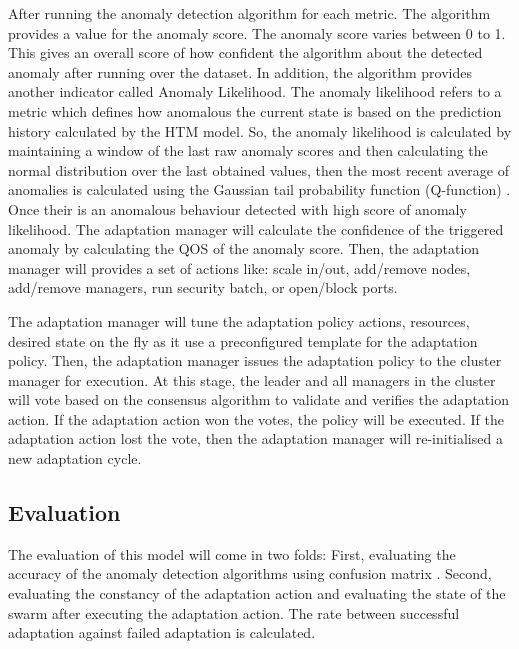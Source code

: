 \documentclass[sigconf]{acmart}
\begin{document}
After running the anomaly detection algorithm for each metric. The algorithm provides a value for the anomaly score. The anomaly score varies between 0 to 1. This gives an overall score of how confident the algorithm about the detected anomaly after running over the dataset. In addition, the algorithm provides another indicator called Anomaly Likelihood. The anomaly likelihood refers to a metric which defines how anomalous the current state is based on the prediction history calculated by the HTM model. So, the anomaly likelihood is calculated by maintaining a window of the last raw anomaly scores and then calculating the normal distribution over the last obtained values, then the most recent average of anomalies is calculated using the Gaussian tail probability function (Q-function) \cite{craig1991new}. Once their is an anomalous behaviour detected with high score of anomaly likelihood. The adaptation manager will calculate the confidence of the triggered anomaly by calculating the QOS of the anomaly score. Then, the adaptation manager will provides a set of actions like: scale in/out, add/remove nodes, add/remove managers, run security batch, or open/block ports.  

The adaptation manager will tune the adaptation policy actions, resources, desired state on the fly as it use a preconfigured template for the adaptation policy. Then, the adaptation manager issues the adaptation policy to the cluster manager for execution. At this stage, the   leader and all managers in the cluster will vote based on the consensus algorithm to validate and verifies the adaptation action. If the adaptation action won the votes, the policy will be executed. If the adaptation action lost the vote, then the adaptation manager will re-initialised a new adaptation cycle.  
 

 \subsection{Evaluation} 
\label{sec:evaluation}
The evaluation of this model will come in two folds: First, evaluating the accuracy of the anomaly detection algorithms using confusion matrix \cite{kohavi1998confusion}.
Second, evaluating the constancy of the adaptation action and evaluating the state of the swarm after executing the adaptation action. The rate between successful adaptation against failed adaptation is calculated. 
\end{document}
